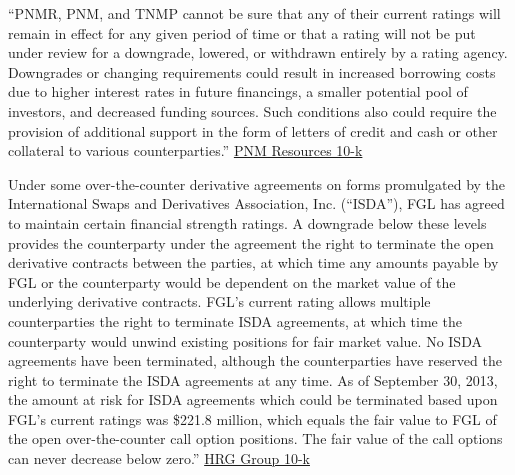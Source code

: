 \documentclass[a4paper, 12pt]{article}
\begin{document}
\begin{displayquote}
\begin{small}
\begin{singlespace}
``PNMR, PNM, and TNMP cannot be sure that any of their current ratings will remain in effect for any given period of time or that a rating will not be put under review for a downgrade, lowered, or withdrawn entirely by a rating agency. Downgrades or changing requirements could result in increased borrowing costs due to higher interest rates in future financings, a smaller potential pool of investors, and decreased funding sources. Such conditions also could require the provision of additional support in the form of letters of credit and cash or other collateral to various counterparties.'' \href{https://www.sec.gov/Archives/edgar/data/22767/000110842614000016/pnm1231201310-k.htm}{PNM Resources 10-k}
\end{singlespace}
\end{small}
\end{displayquote}

\begin{displayquote}
\begin{small}
\begin{singlespace}

Under some over-the-counter derivative agreements on forms promulgated by the International Swaps and Derivatives Association, Inc. (“ISDA”), FGL has agreed to maintain certain financial strength ratings. A downgrade below these levels provides the counterparty under the agreement the right to terminate the open derivative contracts between the parties, at which time any amounts payable by FGL or the counterparty would be dependent on the market value of the underlying derivative contracts. FGL’s current rating allows multiple counterparties the right to terminate ISDA agreements, at which time the counterparty would unwind existing positions for fair market value. No ISDA agreements have been terminated, although the counterparties have reserved the right to terminate the ISDA agreements at any time. As of September 30, 2013, the amount at risk for ISDA agreements which could be terminated based upon FGL’s current ratings was \$221.8 million, which equals the fair value to FGL of the open over-the-counter call option positions. The fair value of the call options can never decrease below zero.'' \href{https://www.sec.gov/Archives/edgar/data/109177/000010917714000040/hrg-9302014x10xk.htm}{HRG Group 10-k}


\end{singlespace}
\end{small}
\end{displayquote}
\end{document}
